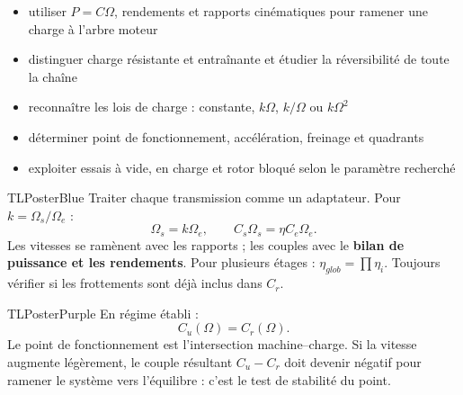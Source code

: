 \documentclass[10pt,a3paper]{article}
\begin{document}
\vspace{2mm}
\begin{minipage}[t]{0.60\linewidth}
\begin{TLPosterSavoirs}
\begin{itemize}
  \item utiliser $P=C\Omega$, rendements et rapports cinématiques pour ramener une charge à l'arbre moteur
  \item distinguer charge résistante et entraînante et étudier la réversibilité de toute la chaîne
  \item reconnaître les lois de charge : constante, $k\Omega$, $k/\Omega$ ou $k\Omega^2$
  \item déterminer point de fonctionnement, accélération, freinage et quadrants
  \item exploiter essais à vide, en charge et rotor bloqué selon le paramètre recherché
\end{itemize}
\end{TLPosterSavoirs}
\end{minipage}\hfill
\begin{minipage}[t]{0.37\linewidth}
\end{minipage}
\vfill
\begin{minipage}[t]{0.49\linewidth}
\begin{TLPosterBloc}{TLPosterBlue}
Traiter chaque transmission comme un adaptateur. Pour $k=\Omega_s/\Omega_e$ :
\[
\Omega_s=k\Omega_e,\qquad C_s\Omega_s=\eta C_e\Omega_e.
\]
Les vitesses se ramènent avec les rapports ; les couples avec le \textbf{bilan de puissance et les rendements}. Pour plusieurs étages : $\eta_{glob}=\prod\eta_i$. Toujours vérifier si les frottements sont déjà inclus dans $C_r$.
\end{TLPosterBloc}
\begin{TLPosterBloc}{TLPosterPurple}
En régime établi :
\[
C_u(\Omega)=C_r(\Omega).
\]
Le point de fonctionnement est l'intersection machine--charge. Si la vitesse augmente légèrement, le couple résultant $C_u-C_r$ doit devenir négatif pour ramener le système vers l'équilibre : c'est le test de stabilité du point.
\end{TLPosterBloc}
\end{minipage}\hfill
\end{document}
